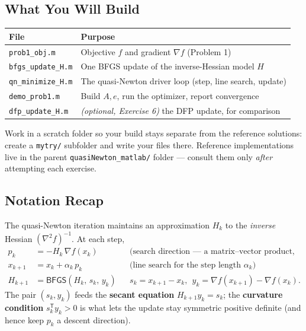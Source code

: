 \documentclass[11pt,letterpaper]{article}
\newcommand{\grad}{\nabla}
\newcommand{\T}{^{\mathsf{T}}}
\begin{document}
\subsection{What You Will Build}
\begin{center}
\begin{tabular}{lp{8.4cm}}
\toprule
\textbf{File} & \textbf{Purpose} \\
\midrule
\texttt{prob1\_obj.m}     & Objective $f$ and gradient $\grad f$ (Problem 1) \\
\texttt{bfgs\_update\_H.m} & One BFGS update of the inverse-Hessian model $H$ \\
\texttt{qn\_minimize\_H.m} & The quasi-Newton driver loop (step, line search, update) \\
\texttt{demo\_prob1.m}    & Build $A,e$, run the optimizer, report convergence \\
\texttt{dfp\_update\_H.m} & \emph{(optional, Exercise 6)} the DFP update, for comparison \\
\bottomrule
\end{tabular}
\end{center}

Work in a scratch folder so your build stays separate from the reference solutions:
create a \texttt{mytry/} subfolder and write your files there. Reference
implementations live in the parent \texttt{quasiNewton\_matlab/} folder --- consult
them only \emph{after} attempting each exercise.

\subsection{Notation Recap}
The quasi-Newton iteration maintains an approximation $H_k$ to the \emph{inverse}
Hessian $(\grad^2 f)^{-1}$. At each step,
\begin{align*}
p_k &= -H_k\,\grad f(x_k) && \text{(search direction --- a matrix--vector product, no solve)}\\
x_{k+1} &= x_k + \alpha_k\,p_k && \text{(line search for the step length $\alpha_k$)}\\
H_{k+1} &= \textsf{BFGS}(H_k,\,s_k,\,y_k) && s_k=x_{k+1}-x_k,\ \ y_k=\grad f(x_{k+1})-\grad f(x_k).
\end{align*}
The pair $(s_k,y_k)$ feeds the \textbf{secant equation} $H_{k+1}y_k=s_k$; the
\textbf{curvature condition} $s_k\T y_k>0$ is what lets the update stay symmetric
positive definite (and hence keep $p_k$ a descent direction).

\end{document}
